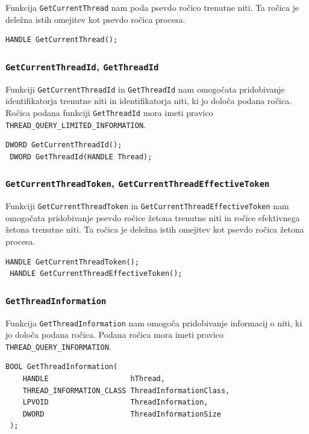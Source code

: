 \documentclass[a4paper,12pt,openright]{book}
\begin{document}
Funkcija \texttt{GetCurrentThread} nam poda psevdo ročico trenutne niti.
Ta ročica je deležna istih omejitev kot psevdo ročica procesa.

\begin{lstlisting}[style=func]
 HANDLE GetCurrentThread();
\end{lstlisting}

\subsubsection{\texttt{GetCurrentThreadId}, \texttt{GetThreadId}}

Funkciji \texttt{GetCurrentThreadId} in \texttt{GetThreadId} nam omogočata pridobivanje identifikatorja trenutne niti in identifikatorja niti, ki jo določa podana ročica.
Ročica podana funkciji \texttt{GetThreadId} mora imeti pravico \texttt{THREAD\_QUERY\_LIMITED\_INFORMATION}.

\begin{lstlisting}[style=func]
 DWORD GetCurrentThreadId();
 DWORD GetThreadId(HANDLE Thread);
\end{lstlisting}

\subsubsection{\texttt{GetCurrentThreadToken}, \texttt{GetCurrentThreadEffectiveToken}}

Funkciji \texttt{GetCurrentThreadToken} in \texttt{GetCurrentThreadEffectiveToken} nam omogočata pridobivanje psevdo ročice žetona trenutne niti in ročice efektivnega žetona trenutne niti.
Ta ročica je deležna istih omejitev kot psevdo ročica žetona procesa.

\begin{lstlisting}[style=func]
 HANDLE GetCurrentThreadToken();
 HANDLE GetCurrentThreadEffectiveToken();
\end{lstlisting}

\subsubsection{\texttt{GetThreadInformation}}

Funkcija \texttt{GetThreadInformation} nam omogoča pridobivanje informacij o niti, ki jo določa podana ročica.
Podana ročica mora imeti pravico \texttt{THREAD\_QUERY\_INFORMATION}.

\begin{lstlisting}[style=func]
 BOOL GetThreadInformation(
	HANDLE                   hThread,
	THREAD_INFORMATION_CLASS ThreadInformationClass,
	LPVOID                   ThreadInformation,
	DWORD                    ThreadInformationSize
 );
\end{lstlisting}
\end{document}
